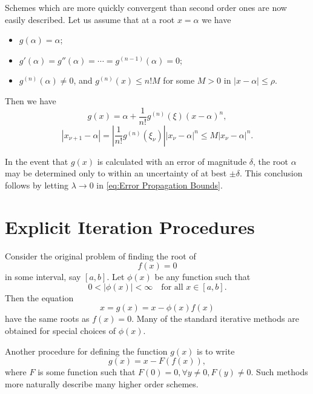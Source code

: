 \documentclass[../main.tex]{subfiles}
\begin{document}
Schemes which are more quickly convergent than second order ones are now easily described. Let us assume that at a root $x = \alpha$ we have
\begin{itemize}
	\item $g(\alpha) = \alpha$;
	\item $g'(\alpha) = g''(\alpha) = \cdots = g^{(n-1)}(\alpha) = 0$;
	\item $g^{(n)}(\alpha) \neq 0$, and $g^{(n)}(x) \leq n! M$ for some $M > 0$ in $|x - \alpha| \leq \rho$.
\end{itemize}
Then we have
\begin{equation*}
	g(x) = \alpha + \frac{1}{n!} g^{(n)}(\xi) (x - \alpha)^n,
\end{equation*}
\begin{equation*}
	|x_{\nu+1} - \alpha| = \left| \frac{1}{n!} g^{(n)}(\xi_{\nu}) \right| |x_{\nu} - \alpha|^n \leq M |x_{\nu} - \alpha|^n.
\end{equation*}

In the event that $g(x)$ is calculated with an error of magnitude $\delta$, the root $\alpha$ may be determined only to within an uncertainty of at best $\pm \delta$. This conclusion follows by letting $\lambda \to 0$ in \eqref{eq:Error Propagation Bounds}.

\section{Explicit Iteration Procedures}
Consider the original problem of finding the root of
\begin{equation*}
	f(x) = 0
\end{equation*}
in some interval, say $[a,b]$. Let $\phi(x)$ be any function such that
\begin{equation}
	0 < |\phi(x)| < \infty \quad \text{for all } x \in [a,b].
\end{equation}
Then the equation
\begin{equation}
	x = g(x) = x - \phi(x) f(x)
\end{equation}
have the same roots as $f(x) = 0$. Many of the standard iterative methods are obtained for special choices of $\phi(x)$.

Another procedure for defining the function $g(x)$ is to write
\begin{equation}
	g(x) = x - F(f(x)),
\end{equation}
where $F$ is some function such that $F(0) = 0, \forall y \neq 0, F(y) \neq 0$. Such methods more naturally describe many higher order schemes.
\end{document}
